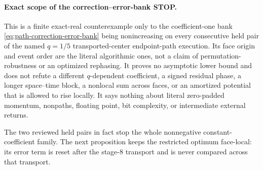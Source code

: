 \paragraph{Exact scope of the correction--error-bank STOP.}
This is a finite exact-real counterexample only to the coefficient-one bank
\cref{eq:path-correction-error-bank} being nonincreasing on every consecutive
held pair of the named $q=1/5$ transported-center endpoint-path execution.
Its face origin and event order are the literal algorithmic ones, not a claim
of permutation-robustness or an optimized rephasing.
It proves no asymptotic lower bound and does not refute a different
$q$-dependent coefficient, a signed residual phase, a longer space--time
block, a nonlocal sum across faces, or an amortized potential that is allowed
to rise locally.  It says nothing about literal zero-padded momentum,
nonpaths, floating point, bit complexity, or intermediate external returns.

The two reviewed held pairs in fact stop the whole nonnegative
constant-coefficient family.  The next proposition keeps the restricted
optimum face-local: its error term is reset after the stage-$8$ transport and
is never compared across that transport.

